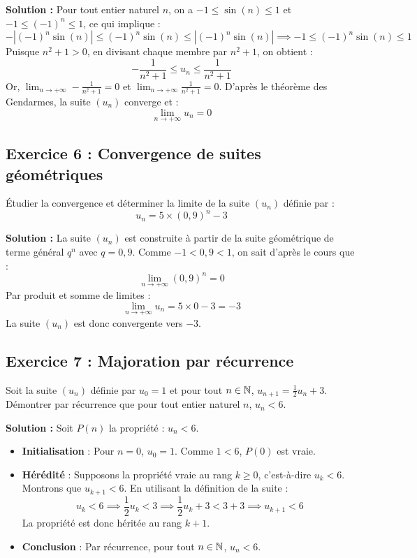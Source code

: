 \textbf{Solution :}
Pour tout entier naturel $n$, on a $-1 \le \sin(n) \le 1$ et $-1 \le (-1)^n \le 1$, ce qui implique :
\[
-|(-1)^n \sin(n)| \le (-1)^n \sin(n) \le |(-1)^n \sin(n)| \implies -1 \le (-1)^n \sin(n) \le 1
\]
Puisque $n^2 + 1 > 0$, en divisant chaque membre par $n^2+1$, on obtient :
\[
-\frac{1}{n^2 + 1} \le u_n \le \frac{1}{n^2 + 1}
\]
Or, $\lim_{n \to +\infty} -\frac{1}{n^2 + 1} = 0$ et $\lim_{n \to +\infty} \frac{1}{n^2 + 1} = 0$.
D'après le théorème des Gendarmes, la suite $(u_n)$ converge et :
\[
\lim_{n \to +\infty} u_n = 0
\]

\subsection*{Exercice 6 : Convergence de suites géométriques}
Étudier la convergence et déterminer la limite de la suite $(u_n)$ définie par :
\[
u_n = 5 \times (0,9)^n - 3
\]

\textbf{Solution :}
La suite $(u_n)$ est construite à partir de la suite géométrique de terme général $q^n$ avec $q = 0,9$.
Comme $-1 < 0,9 < 1$, on sait d'après le cours que :
\[
\lim_{n \to +\infty} (0,9)^n = 0
\]
Par produit et somme de limites :
\[
\lim_{n \to +\infty} u_n = 5 \times 0 - 3 = -3
\]
La suite $(u_n)$ est donc convergente vers $-3$.

\subsection*{Exercice 7 : Majoration par récurrence}
Soit la suite $(u_n)$ définie par $u_0 = 1$ et pour tout $n \in \mathbb{N}$, $u_{n+1} = \frac{1}{2} u_n + 3$.
Démontrer par récurrence que pour tout entier naturel $n$, $u_n < 6$.

\textbf{Solution :}
Soit $P(n)$ la propriété : $u_n < 6$.
\begin{itemize}
    \item \textbf{Initialisation} : Pour $n = 0$, $u_0 = 1$. Comme $1 < 6$, $P(0)$ est vraie.
    \item \textbf{Hérédité} : Supposons la propriété vraie au rang $k \ge 0$, c'est-à-dire $u_k < 6$.
    Montrons que $u_{k+1} < 6$. En utilisant la définition de la suite :
    \[
    u_k < 6 \implies \frac{1}{2} u_k < 3 \implies \frac{1}{2} u_k + 3 < 3 + 3 \implies u_{k+1} < 6
    \]
    La propriété est donc héritée au rang $k+1$.
    \item \textbf{Conclusion} : Par récurrence, pour tout $n \in \mathbb{N}$, $u_n < 6$.
\end{itemize}

